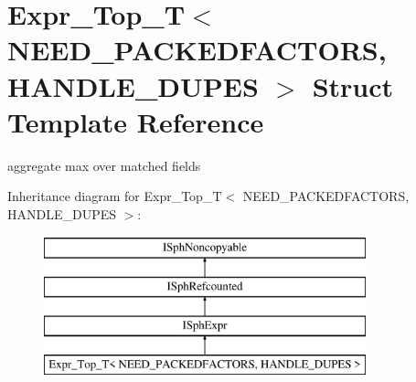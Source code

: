 \hypertarget{structExpr__Top__T}{\section{Expr\-\_\-\-Top\-\_\-\-T$<$ N\-E\-E\-D\-\_\-\-P\-A\-C\-K\-E\-D\-F\-A\-C\-T\-O\-R\-S, H\-A\-N\-D\-L\-E\-\_\-\-D\-U\-P\-E\-S $>$ Struct Template Reference}
\label{structExpr__Top__T}
}


aggregate max over matched fields  


Inheritance diagram for Expr\-\_\-\-Top\-\_\-\-T$<$ N\-E\-E\-D\-\_\-\-P\-A\-C\-K\-E\-D\-F\-A\-C\-T\-O\-R\-S, H\-A\-N\-D\-L\-E\-\_\-\-D\-U\-P\-E\-S $>$\-:\begin{figure}[H]
\begin{center}
\leavevmode
\includegraphics[height=4.000000cm]{structExpr__Top__T}
\end{center}
\end{figure}
